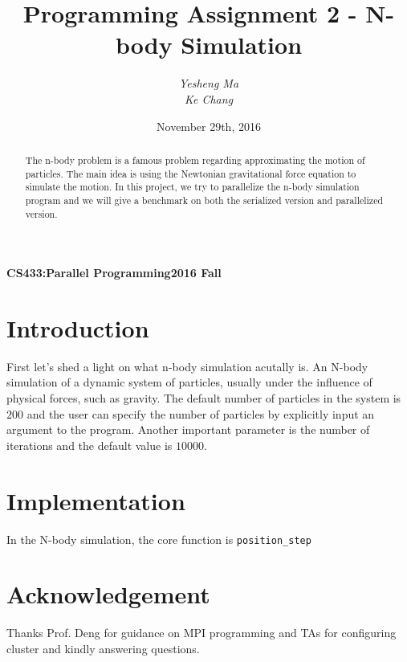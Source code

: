 \documentclass{article}
\begin{document}
\title{Programming Assignment 2 - N-body Simulation}
\author{\textit{Yesheng Ma}\\\textit{Ke Chang}}
\date{November 29th, 2016}
{\bf\small CS433:Parallel Programming}\hfill{\bf\small 2016 Fall}
{\let\newpage\relax\maketitle}
\maketitle


\begin{abstract}
	The n-body problem is a famous problem regarding approximating the motion of particles. The main idea is using the Newtonian gravitational force equation
	to simulate the motion. In this project, we try to parallelize the n-body simulation program and we will give a benchmark on both the serialized version
	and parallelized version.
\end{abstract}


\section{Introduction}
First let's shed a light on what n-body simulation acutally is. An N-body simulation of a dynamic system of particles, usually under the influence of physical
forces, such as gravity. The default number of particles in the system is $200$ and the user can specify the number of particles by explicitly input an argument
to	the program. Another important parameter is the number of iterations and the default value is $10000$.

\section{Implementation}
In the N-body simulation, the core function is \verb|position_step|
\section*{Acknowledgement}
Thanks Prof. Deng for guidance on MPI programming and TAs for configuring cluster and kindly answering questions.
\end{document}
